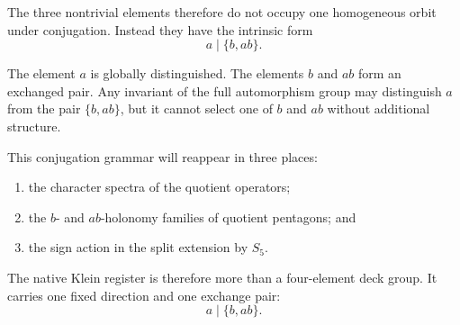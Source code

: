 The three nontrivial elements therefore do not occupy one homogeneous
orbit under conjugation. Instead they have the intrinsic form
\[
a\mid\{b,ab\}.
\]

The element \(a\) is globally distinguished. The elements \(b\) and
\(ab\) form an exchanged pair. Any invariant of the full automorphism
group may distinguish \(a\) from the pair \(\{b,ab\}\), but it cannot
select one of \(b\) and \(ab\) without additional structure.

This conjugation grammar will reappear in three places:

\begin{enumerate}
    \item the character spectra of the quotient operators;
    \item the \(b\)- and \(ab\)-holonomy families of quotient
    pentagons; and
    \item the sign action in the split extension by \(S_5\).
\end{enumerate}

The native Klein register is therefore more than a four-element deck
group. It carries one fixed direction and one exchange pair:
\[
\boxed{a\mid\{b,ab\}}.
\]
